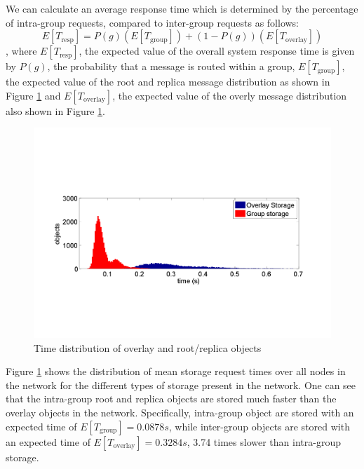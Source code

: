 \documentclass[10pt,a4paper,conference]{IEEEtran}
\begin{document}
We can calculate an average response time which is determined by the percentage of intra-group requests, compared to inter-group requests as follows:
%
\begin{equation}\label{expected_response_time}
    E[T_{\textrm{resp}}] = P(g)\left(E\left[T_{\textrm{group}}\right]\right) + \left(1 - P(g)\right)\left(E\left[T_{\textrm{overlay}}\right]\right)
\end{equation}
%
, where $E[T_{\textrm{resp}}]$, the expected value of the overall system response time is given by $P(g)$, the probability that a message is routed
within a group, $E\left[T_{\textrm{group}}\right]$, the expected value of the root and replica message distribution as shown in Figure
\ref{fig_pithos_response} and $E\left[T_{\textrm{overlay}}\right]$, the expected value of the overly message distribution also shown in Figure
\ref{fig_pithos_response}.

\begin{figure}[htbp]
 \centering
 \includegraphics[clip=true, viewport=2cm 5cm 27cm 14.5cm, width=\columnwidth]{request_time_distribution}
 \caption{Time distribution of overlay and root/replica objects}
 \label{fig_pithos_response}
\end{figure}
%
Figure \ref{fig_pithos_response} shows the distribution of mean storage request times over all nodes in the network for the different types of
storage present in the network. One can see that the intra-group root and replica objects are stored much faster than the overlay objects in the
network. Specifically, intra-group object are stored with an expected time of $E\left[T_{\textrm{group}}\right] =  0.0878 s$, while inter-group
objects are stored with an expected time of $E\left[T_{\textrm{overlay}}\right] = 0.3284 s$, 3.74 times slower than intra-group storage.
\end{document}
